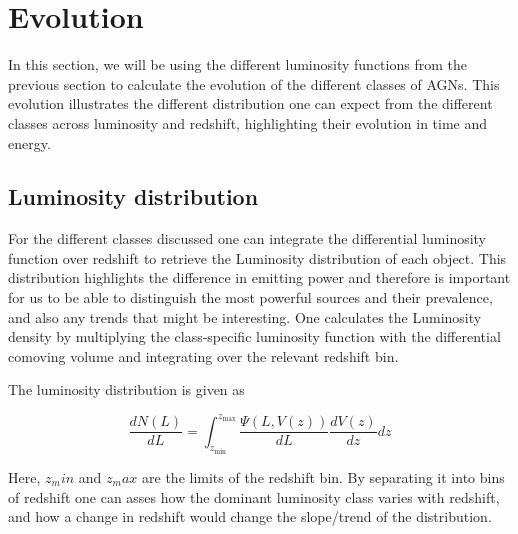 \documentclass{article}
\begin{document}
\section{Evolution}
In this section, we will be using the different luminosity functions from the previous section to calculate the evolution of the different classes of AGNs. 
This evolution illustrates the different distribution one can expect from the different classes across luminosity and redshift, highlighting their evolution in time and energy.


 


\subsection{Luminosity distribution}
 
For the different classes discussed one can integrate the differential luminosity function over redshift to retrieve the Luminosity distribution of each 
object. This distribution highlights the difference in emitting power and therefore is important for us to be able to distinguish the most powerful 
sources and their prevalence, and also any trends that might be interesting. One calculates the Luminosity density by multiplying the class-specific luminosity
function with the differential comoving volume and integrating over the relevant redshift bin. 

The luminosity distribution is given as


\begin{equation}
    \frac{dN(L)}{dL} = \int_{z_{\text{min}}}^{z_{\text{max}}} \frac{\Psi(L, V(z))}{dL} \frac{dV(z)}{dz} dz
\end{equation}

Here, $z_min$ and $z_max$ are the limits of the redshift bin. By separating it into
bins of redshift one can asses how the dominant luminosity class varies with redshift, and how a change in redshift would change the slope/trend of the distribution.  
\end{document}
